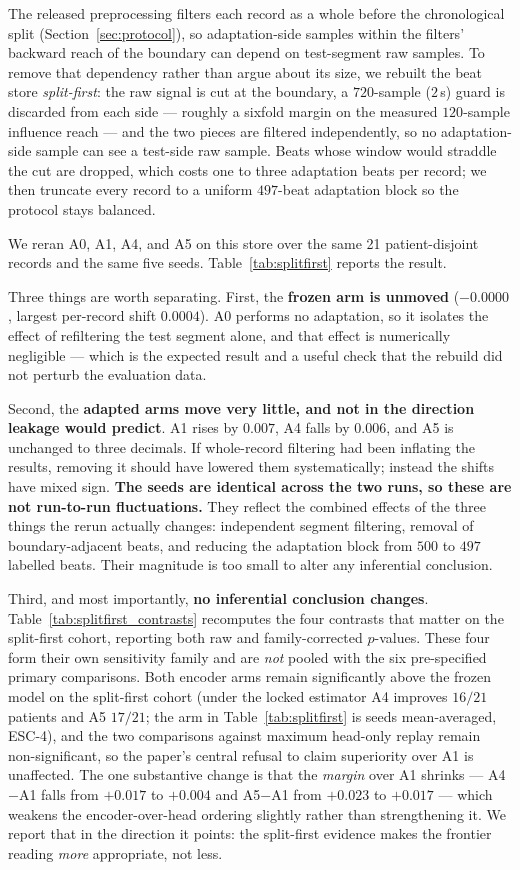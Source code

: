 The released preprocessing filters each record as a whole before the
chronological split (Section~\ref{sec:protocol}), so adaptation-side samples
within the filters' backward reach of the boundary can depend on test-segment raw
samples. To remove that dependency rather than argue about its size, we rebuilt
the beat store \emph{split-first}: the raw signal is cut at the boundary, a
$720$-sample ($2$\,s) guard is discarded from each side --- roughly a sixfold
margin on the measured $120$-sample influence reach --- and the two pieces are
filtered independently, so no adaptation-side sample can see a test-side raw
sample. Beats whose window would straddle the cut are dropped, which costs one to
three adaptation beats per record; we then truncate every record to a uniform
$497$-beat adaptation block so the protocol stays balanced.

We reran A0, A1, A4, and A5 on this store over the same 21 patient-disjoint
records and the same five seeds. Table~\ref{tab:splitfirst} reports the result.

Three things are worth separating. First, the \textbf{frozen arm is unmoved}
($-0.0000$, largest per-record shift $0.0004$). A0 performs no adaptation, so it
isolates the effect of refiltering the test segment alone, and that effect is
numerically negligible --- which is the expected result and a useful check that
the rebuild did not perturb the evaluation data.

Second, the \textbf{adapted arms move very little, and not in the direction
leakage would predict}. A1 rises by $0.007$, A4 falls by $0.006$, and A5 is
unchanged to three decimals. If whole-record filtering had been inflating the
results, removing it should have lowered them systematically; instead the shifts
have mixed sign. \textbf{The seeds are identical across the two runs, so these
are not run-to-run fluctuations.} They reflect the combined effects of the three
things the rerun actually changes: independent segment filtering, removal of
boundary-adjacent beats, and reducing the adaptation block from $500$ to $497$
labelled beats. Their magnitude is too small to alter any inferential
conclusion.

Third, and most importantly, \textbf{no inferential conclusion changes}.
Table~\ref{tab:splitfirst_contrasts} recomputes the four contrasts that matter
on the split-first cohort, reporting both raw and family-corrected $p$-values.
These four form their own sensitivity family and are \emph{not} pooled with the
six pre-specified primary comparisons. Both
encoder arms remain significantly above the frozen model on the split-first
cohort (under the locked estimator A4 improves $16/21$ patients and A5 $17/21$;
the arm \macrof{} in Table~\ref{tab:splitfirst} is seeds mean-averaged, ESC-4),
and the two comparisons against maximum
head-only replay remain non-significant, so the paper's central refusal to claim
superiority over A1 is unaffected. The one substantive change is that the
\emph{margin} over A1 shrinks --- A4$-$A1 falls from $+0.017$ to $+0.004$ and
A5$-$A1 from $+0.023$ to $+0.017$ --- which weakens the encoder-over-head
ordering slightly rather than strengthening it. We report that in the direction
it points: the split-first evidence makes the frontier reading \emph{more}
appropriate, not less.

